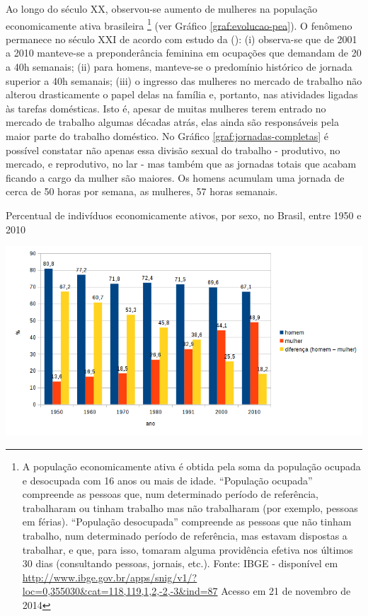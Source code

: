 Ao longo do século XX, observou-se aumento de mulheres na população economicamente ativa brasileira \footnote{A população economicamente ativa é obtida pela soma da população ocupada e desocupada com 16 anos ou mais de idade. ``População ocupada'' compreende as pessoas que, num determinado período de referência, trabalharam ou tinham trabalho mas não trabalharam (por exemplo, pessoas em férias). ``População desocupada'' compreende as pessoas que não tinham trabalho, num determinado período de referência, mas estavam dispostas a trabalhar, e que, para isso, tomaram alguma providência efetiva nos últimos 30 dias (consultando pessoas, jornais, etc.). Fonte: IBGE - disponível em \url{http://www.ibge.gov.br/apps/snig/v1/?loc=0,355030&cat=118,119,1,2,-2,-3&ind=87} Acesso em 21 de novembro de 2014} 
(ver Gráfico \ref{graf:evolucao-pea}). 
O fenômeno permanece no século XXI de acordo com estudo da  (\citeyear{ABRAMO2010}):
(i) observa-se que de 2001 a 2010 manteve-se a preponderância feminina em ocupações que demandam de 20 a 40h semanais;
(ii) para homens, manteve-se o predomínio histórico de jornada superior a 40h semanais;
(iii) o ingresso das mulheres no mercado de trabalho não alterou drasticamente o papel delas na família e, portanto, nas atividades ligadas às tarefas domésticas. Isto é, apesar de muitas mulheres terem entrado no mercado de trabalho algumas décadas atrás, elas ainda são responsáveis pela maior parte do trabalho doméstico. No Gráfico \ref{graf:jornadas-completas} é possível constatar não apenas essa divisão sexual do trabalho - produtivo, no mercado, e reprodutivo, no lar - mas também que as jornadas totais que acabam ficando a cargo da mulher são maiores. Os homens acumulam uma jornada de cerca de 50 horas por semana, as mulheres, 57 horas semanais.

\begin{grafico}[htb]%
    \caption{\label{graf:evolucao-pea}Percentual de indivíduos economicamente ativos, por sexo, no Brasil, entre 1950 e 2010}%
    \begin{center}%
        \includegraphics[width=1.05\textwidth]{./imagens/evolucao-pea1.png}%
    \end{center}%
\end{grafico}%

